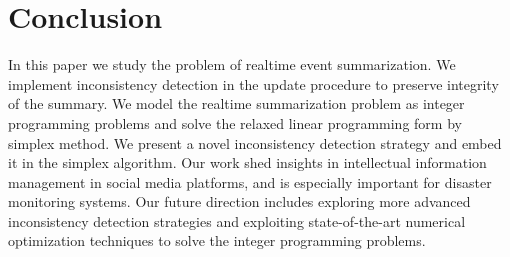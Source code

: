 \documentclass[envcountsame]{llncs}
\begin{document}
\section{Conclusion}\label{sec:conclusion}
 In this paper we study the problem of realtime event summarization. We implement inconsistency detection in the update procedure to preserve integrity of the summary. We model the realtime summarization problem as integer programming problems and solve the relaxed linear programming form by simplex method. We present a novel inconsistency detection strategy and embed it in the simplex algorithm. Our work shed insights in intellectual information management in social media platforms, and is especially important for disaster monitoring systems. Our future direction includes exploring more advanced inconsistency detection strategies and exploiting state-of-the-art numerical optimization techniques to solve the integer programming problems.
\end{document}
